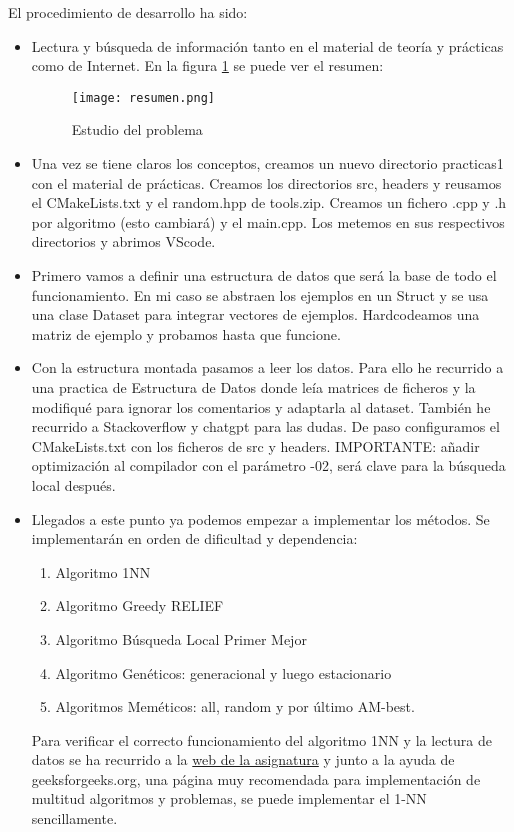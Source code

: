 El procedimiento de desarrollo ha sido:
\begin{itemize}
	\item Lectura y búsqueda de información tanto en el material de teoría y prácticas como de Internet. En la figura \ref{fig:mi_imagen} se puede ver el resumen:
	\begin{figure}[h]
		\centering
		\texttt{[image: resumen.png]}
		\caption{Estudio del problema}
		\label{fig:mi_imagen}
	\end{figure}

	\item Una vez se tiene claros los conceptos, creamos un nuevo directorio practicas1 con el material de prácticas. Creamos los directorios src, headers y reusamos el CMakeLists.txt y el random.hpp de tools.zip. Creamos un fichero .cpp y .h por algoritmo (esto cambiará) y el main.cpp. Los metemos en sus respectivos directorios y abrimos VScode.
	
	\item Primero vamos a definir una estructura de datos que será la base de todo el funcionamiento. En mi caso se abstraen los ejemplos en un Struct y se usa una clase Dataset para integrar vectores de ejemplos. Hardcodeamos una matriz de ejemplo y probamos hasta que funcione.
	
	\item Con la estructura montada pasamos a leer los datos. Para ello he recurrido a una practica de Estructura de Datos donde leía matrices de ficheros y la modifiqué para ignorar los comentarios y adaptarla al dataset.
	También he recurrido a Stackoverflow y chatgpt para las dudas. De paso configuramos el CMakeLists.txt con los ficheros de src y headers. IMPORTANTE: añadir optimización al compilador con el parámetro -02, será clave para la búsqueda local después.
	
	\item Llegados a este punto ya podemos empezar a implementar los métodos. Se implementarán en orden de dificultad y dependencia:
	\begin{enumerate}
		\item Algoritmo 1NN
		\item Algoritmo Greedy RELIEF
		\item Algoritmo Búsqueda Local Primer Mejor
		\item Algoritmo Genéticos: generacional y luego estacionario
		\item Algoritmos Meméticos: all, random y por último AM-best.
	\end{enumerate}
	Para verificar el correcto funcionamiento del algoritmo 1NN y la lectura de datos se ha recurrido a la  \href{https://mh2223.danimolina.net/testsol.html}{web de la asignatura} y junto a la ayuda de geeksforgeeks.org\cite{greekforgeeks}, una página muy recomendada para implementación de multitud algoritmos y problemas, se puede implementar el 1-NN sencillamente. 
	

\end{itemize}
